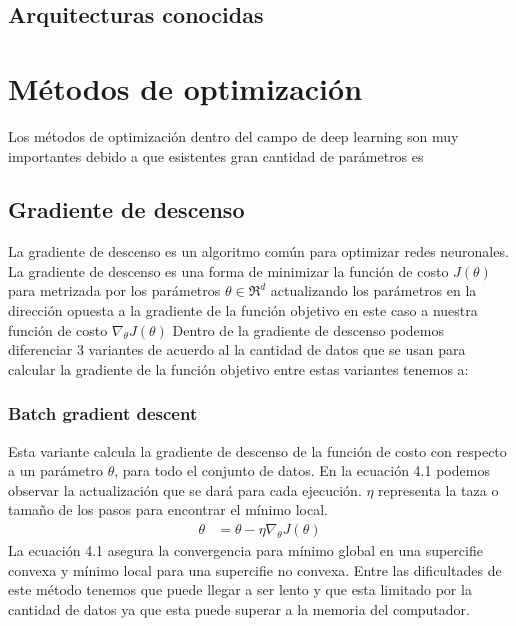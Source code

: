 \subsection{Arquitecturas conocidas}
\section{Métodos de optimización}
Los métodos de optimización dentro del campo de deep learning son muy importantes debido a que esistentes gran cantidad de parámetros es 

\subsection{Gradiente de descenso}
La gradiente de descenso es un algoritmo común para optimizar redes neuronales. La gradiente de descenso es una forma de minimizar la función de costo $J(\theta)$ para metrizada por los parámetros $\theta \in\Re^{d}$ actualizando los parámetros en la dirección opuesta a la gradiente de la función objetivo en este caso a nuestra función de costo $\nabla_{\theta} J(\theta)$
Dentro de la gradiente de descenso podemos diferenciar 3 variantes de acuerdo al la cantidad de datos que se usan para calcular la gradiente de la función objetivo entre estas variantes tenemos a:\\
\subsubsection{Batch gradient descent}
Esta variante calcula la gradiente de descenso de la función de costo con respecto a un parámetro $\theta$, para todo el conjunto de datos. En la ecuación 4.1 podemos observar la actualización que se dará para cada ejecución. $\eta$ representa la taza o tamaño de los pasos para encontrar el mínimo local.
\begin{equation}
\label{bgds}
\begin{aligned}
\theta &= \theta - \eta \nabla_{\theta} J(\theta)
\end{aligned}
\end{equation}
La ecuación 4.1 asegura la convergencia para mínimo global en una supercifie convexa y mínimo local para una supercifie no convexa. Entre las dificultades de este método tenemos que puede llegar a ser lento y que esta limitado por la cantidad de datos ya que esta puede superar a la memoria del computador.	
